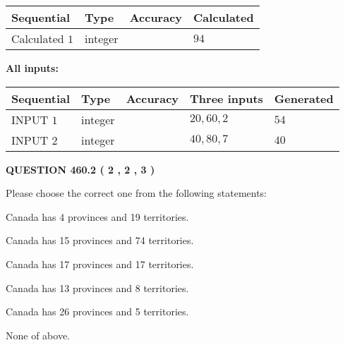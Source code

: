\documentclass[12pt]{article}
\begin{document}
   
   
   
\noindent{}
   
   
  
  
\noindent\begin{tabular}{|l|l|l|l|}
\hline
 Sequential & Type & Accuracy & Calculated \\ 
\hline
 
 
  Calculated $  1 $ & integer &  & 
  $ 94 $ 
 \\  \hline  
 \end{tabular}
   
   
   
   
\noindent\vspace{0.1in}\hspace{-0.08in} {\textbf{\Large{All inputs: }}}
   
   
  
  
\noindent\begin{tabular}{|l|l|l|l|l|}
\hline
 Sequential & Type & Accuracy & Three inputs & Generated \\ 
\hline
 
 
  INPUT $  1 $ & integer &  & $
 20
 , 
 60
 , 
 2
 $ & $ 54 $ 
 \\  \hline  
 
 
  INPUT $  2 $ & integer &  & $
 40
 , 
 80
 , 
 7
 $ & $ 40 $ 
 \\  \hline  
 \end{tabular}
   
   
  
\vspace{0.2in}
  
{\textbf{\Large{QUESTION
460.2 
 ( 2 , 2 , 3 )
}}}
  
  
Please choose the correct one from the following statements:
 
 
Canada has   4 provinces and  19 territories.
 
 
Canada has  15 provinces and  74 territories.
 
 
Canada has  17 provinces and  17 territories.
 
 
Canada has  13 provinces and  8 territories.
 
 
Canada has  26 provinces and  5 territories.
 
 
 None of above.
 
\end{document}
